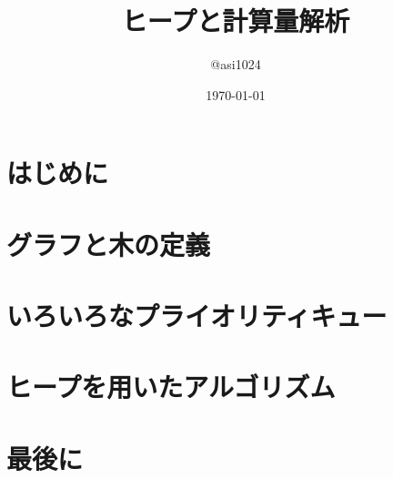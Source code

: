 \documentclass{beamer}
\title{ヒープと計算量解析}
\author{@asi1024}
\institute{Kyoto Univ. Informatics and Mathematical Science 2nd}
\date{\today}
\begin{document}
\frame{\titlepage}
\frame{
  \tableofcontents[sectionstyle=show,subsectionstyle=hide]
}

\section{はじめに}


\section{グラフと木の定義}


\section{いろいろなプライオリティキュー}





\section{ヒープを用いたアルゴリズム}


\section{最後に}

\end{document}
